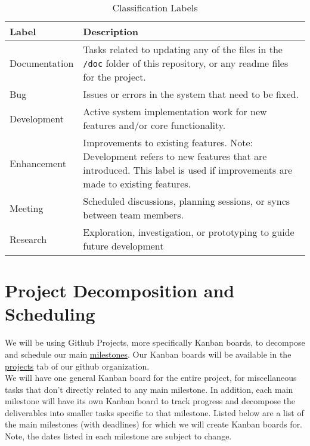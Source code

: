 \documentclass{article}
\begin{document}
\begin{table}[h!]
\centering
\begin{tabularx}{\textwidth}{|l|X|}
\hline
\textbf{Label} & \textbf{Description} \\ \hline
Documentation & Tasks related to updating any of the files in the \texttt{/doc}
folder of this repository, or any readme files for the project. \\ \hline
Bug & Issues or errors in the system that need to be fixed. \\ \hline
Development & Active system implementation work for new features and/or core
functionality. \\ \hline
Enhancement & Improvements to existing features. Note: Development refers to new
features that are introduced. This label is used if improvements are made to
existing features. \\ \hline
Meeting & Scheduled discussions, planning sessions, or syncs between team
members. \\ \hline
Research & Exploration, investigation, or prototyping to guide future
development \\ \hline
\end{tabularx}
\caption{Classification Labels}
\end{table}



\section{Project Decomposition and Scheduling}

We will be using Github Projects, more specifically Kanban boards, to decompose
and schedule our main
\href{https://github.com/Team6-SixSense/audio360/milestones}{milestones}. Our
Kanban boards will be available in the
\href{https://github.com/orgs/Team6-SixSense/projects}{projects} tab of our
github organization. \\

We will have one general Kanban board for the entire project, for miscellaneous
tasks that don't directly related to any main milestone. In addition, each main
milestone will have its own Kanban board to track progress and decompose the
deliverables into smaller tasks specific to that milestone. Listed below are a
list of the main milestones (with deadlines) for which we will create Kanban
boards for. Note, the dates listed in each milestone are subject to change.
\end{document}
